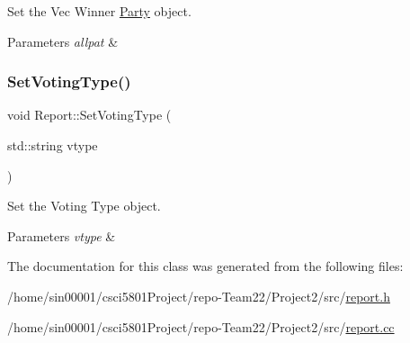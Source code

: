 Set the Vec Winner \hyperlink{classParty}{Party} object. 


\begin{DoxyParams}{Parameters}
{\em allpat} & \\
\hline
\end{DoxyParams}
\mbox{\label{classReport_a803f4835f3ae218eed411f18f48b7590}} 
\subsubsection{\texorpdfstring{Set\+Voting\+Type()}{SetVotingType()}}
{\footnotesize\ttfamily void Report\+::\+Set\+Voting\+Type (\begin{DoxyParamCaption}\item[{std\+::string}]{vtype }\end{DoxyParamCaption})\hspace{0.3cm}{\ttfamily [inline]}}



Set the Voting Type object. 


\begin{DoxyParams}{Parameters}
{\em vtype} & \\
\hline
\end{DoxyParams}


The documentation for this class was generated from the following files\+:\begin{DoxyCompactItemize}
\item 
/home/sin00001/csci5801\+Project/repo-\/\+Team22/\+Project2/src/\hyperlink{report_8h}{report.\+h}\item 
/home/sin00001/csci5801\+Project/repo-\/\+Team22/\+Project2/src/\hyperlink{report_8cc}{report.\+cc}\end{DoxyCompactItemize}
